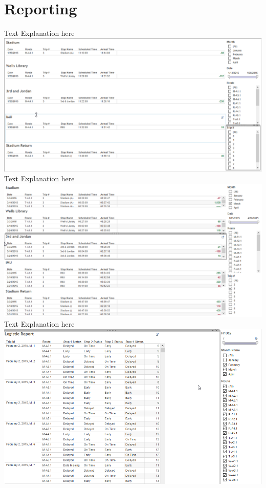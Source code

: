\documentclass[12pt]{article}
\begin{document}
\section{Reporting}
Text Explanation here\\
\includegraphics[scale=0.55]{resources/tableau4}\\[1cm] 
Text Explanation here\\
\includegraphics[scale=0.55]{resources/tableau5}\\[1cm] 
Text Explanation here\\
\includegraphics[scale=0.55]{resources/tableau6}\\[1cm] 
\end{document}
